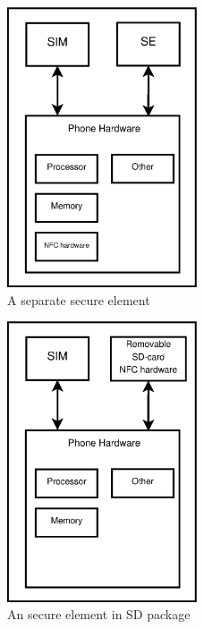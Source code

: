 \begin{figure}
\includegraphics[width=0.5\textwidth]{images/phone_with_SE_nokia}
\caption[Nokia phone with SE]
{
A separate secure element
}
\label{fig:integrated_se}
\end{figure}

\begin{figure}
\includegraphics[width=0.5\textwidth]{images/SD_NFC}
\caption[SE in SD package]
{
An secure element in SD package
}
\label{fig:modular_se}
\end{figure}

